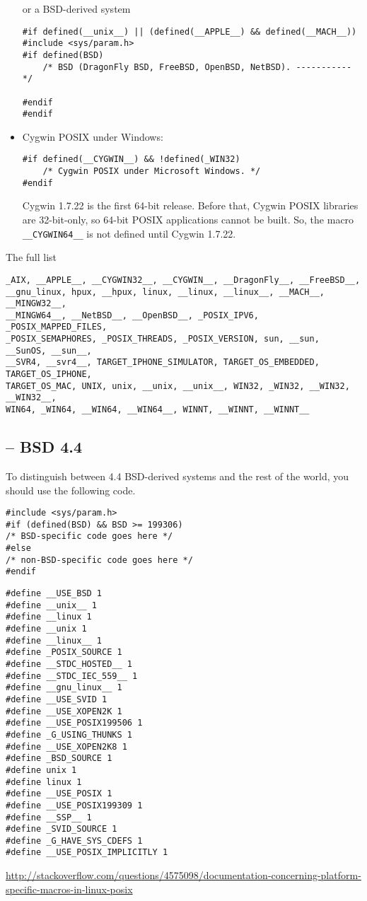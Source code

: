 \begin{itemize}
or a BSD-derived system
\begin{lstlisting}
#if defined(__unix__) || (defined(__APPLE__) && defined(__MACH__))
#include <sys/param.h>
#if defined(BSD)
    /* BSD (DragonFly BSD, FreeBSD, OpenBSD, NetBSD). ----------- */

#endif
#endif
\end{lstlisting}

  \item Cygwin POSIX under Windows:
\begin{lstlisting}
#if defined(__CYGWIN__) && !defined(_WIN32)
    /* Cygwin POSIX under Microsoft Windows. */
#endif
\end{lstlisting}

Cygwin 1.7.22 is the first 64-bit release. Before that, Cygwin POSIX libraries
are 32-bit-only, so 64-bit POSIX applications cannot be built. So, the macro
\verb!__CYGWIN64__! is not defined until Cygwin 1.7.22.

\end{itemize}

The full list
\begin{lstlisting}
_AIX, __APPLE__, __CYGWIN32__, __CYGWIN__, __DragonFly__, __FreeBSD__,
__gnu_linux, hpux, __hpux, linux, __linux, __linux__, __MACH__, __MINGW32__,
__MINGW64__, __NetBSD__, __OpenBSD__, _POSIX_IPV6, _POSIX_MAPPED_FILES,
_POSIX_SEMAPHORES, _POSIX_THREADS, _POSIX_VERSION, sun, __sun, __SunOS, __sun__,
__SVR4, __svr4__, TARGET_IPHONE_SIMULATOR, TARGET_OS_EMBEDDED, TARGET_OS_IPHONE,
TARGET_OS_MAC, UNIX, unix, __unix, __unix__, WIN32, _WIN32, __WIN32, __WIN32__,
WIN64, _WIN64, __WIN64, __WIN64__, WINNT, __WINNT, __WINNT__
\end{lstlisting}


\subsection{-- BSD 4.4}

To distinguish between 4.4 BSD-derived systems and the rest of the world, you
should use the following code.
\begin{verbatim}
#include <sys/param.h>
#if (defined(BSD) && BSD >= 199306)
/* BSD-specific code goes here */
#else
/* non-BSD-specific code goes here */
#endif

\end{verbatim}


\begin{verbatim}
#define __USE_BSD 1
#define __unix__ 1
#define __linux 1
#define __unix 1
#define __linux__ 1
#define _POSIX_SOURCE 1
#define __STDC_HOSTED__ 1
#define __STDC_IEC_559__ 1
#define __gnu_linux__ 1
#define __USE_SVID 1
#define __USE_XOPEN2K 1
#define __USE_POSIX199506 1
#define _G_USING_THUNKS 1
#define __USE_XOPEN2K8 1
#define _BSD_SOURCE 1
#define unix 1
#define linux 1
#define __USE_POSIX 1
#define __USE_POSIX199309 1
#define __SSP__ 1
#define _SVID_SOURCE 1
#define _G_HAVE_SYS_CDEFS 1
#define __USE_POSIX_IMPLICITLY 1
\end{verbatim} 
\url{http://stackoverflow.com/questions/4575098/documentation-concerning-platform-specific-macros-in-linux-posix}


